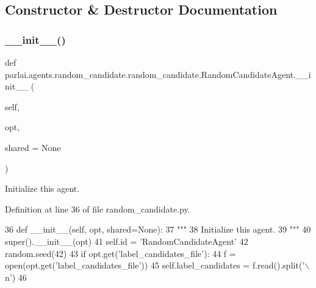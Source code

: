 \subsection{Constructor \& Destructor Documentation}
\mbox{\label{classparlai_1_1agents_1_1random__candidate_1_1random__candidate_1_1RandomCandidateAgent_a3c2a96128e8a9825e552d6e999e55490}} 
\subsubsection{\texorpdfstring{\+\_\+\+\_\+init\+\_\+\+\_\+()}{\_\_init\_\_()}}
{\footnotesize\ttfamily def parlai.\+agents.\+random\+\_\+candidate.\+random\+\_\+candidate.\+Random\+Candidate\+Agent.\+\_\+\+\_\+init\+\_\+\+\_\+ (\begin{DoxyParamCaption}\item[{}]{self,  }\item[{}]{opt,  }\item[{}]{shared = {\ttfamily None} }\end{DoxyParamCaption})}

\begin{DoxyVerb}Initialize this agent.
\end{DoxyVerb}
 

Definition at line 36 of file random\+\_\+candidate.\+py.


\begin{DoxyCode}
36     \textcolor{keyword}{def }\_\_init\_\_(self, opt, shared=None):
37         \textcolor{stringliteral}{"""}
38 \textcolor{stringliteral}{        Initialize this agent.}
39 \textcolor{stringliteral}{        """}
40         super().\_\_init\_\_(opt)
41         self.id = \textcolor{stringliteral}{'RandomCandidateAgent'}
42         random.seed(42)
43         \textcolor{keywordflow}{if} opt.get(\textcolor{stringliteral}{'label\_candidates\_file'}):
44             f = open(opt.get(\textcolor{stringliteral}{'label\_candidates\_file'}))
45             self.label\_candidates = f.read().split(\textcolor{stringliteral}{'\(\backslash\)n'})
46 
\end{DoxyCode}


